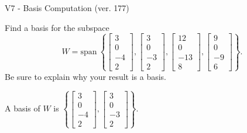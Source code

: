 \begin{exercise}
  \begin{exerciseTitle}V7 - Basis Computation (ver. 177)\end{exerciseTitle}
  \begin{exerciseStatement}
    Find a basis for the subspace 
\[W=\mathrm{span}\ \left\{\left[\begin{array}{r}
3 \\
0 \\
-4 \\
2
\end{array}\right] , \left[\begin{array}{r}
3 \\
0 \\
-3 \\
2
\end{array}\right] , \left[\begin{array}{r}
12 \\
0 \\
-13 \\
8
\end{array}\right] , \left[\begin{array}{r}
9 \\
0 \\
-9 \\
6
\end{array}\right]\right\}.\]
 Be sure to explain why your result is a basis.


  \end{exerciseStatement}
  \begin{exerciseAnswer}
   A basis of \(W\) is  \(\left\{\left[\begin{array}{r}
3 \\
0 \\
-4 \\
2
\end{array}\right] , \left[\begin{array}{r}
3 \\
0 \\
-3 \\
2
\end{array}\right]\right\}\).
  


  \end{exerciseAnswer}
\end{exercise}